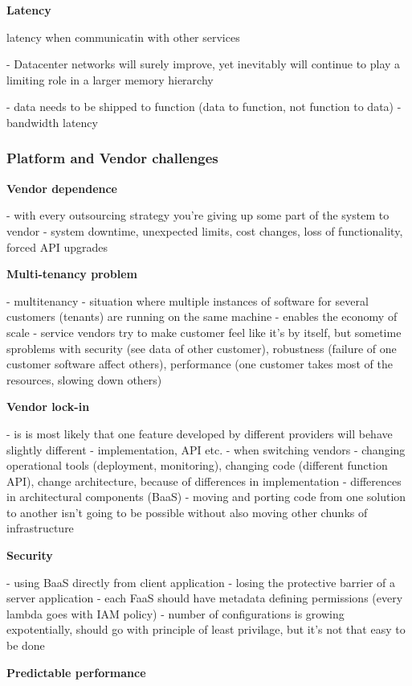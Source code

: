 \textbf{Latency} 

latency when communicatin with other services

- Datacenter networks will surely improve, yet inevitably will continue to play a limiting role in a larger memory hierarchy

- data needs to be shipped to function (data to function, not function to data) - bandwidth latency

\subsubsection*{Platform and Vendor challenges} 

\textbf{Vendor dependence} 

- with every outsourcing strategy you're giving up some part of the system to vendor - system downtime, unexpected limits, cost changes, loss of functionality, forced API upgrades

\textbf{Multi-tenancy problem} 

- multitenancy - situation where multiple instances of software for several customers (tenants) are running on the same machine - enables the economy of scale
- service vendors try to make customer feel like it's by itself, but sometime sproblems with security (see data of other customer), robustness (failure of one customer software affect others), performance (one customer takes most of the resources, slowing down others)

\textbf{Vendor lock-in} 

- is is most likely that one feature developed by different providers will behave slightly different - implementation, API etc.
- when switching vendors - changing operational tools (deployment, monitoring), changing code (different function API), change architecture, because of differences in implementation
- differences in architectural components (BaaS) - moving and porting code from one solution to another isn't going to be possible without also moving other chunks of infrastructure

\textbf{Security} 

- using BaaS directly from client application - losing the protective barrier of a server application
- each FaaS should have metadata defining permissions (every lambda goes with IAM policy) - number of configurations is growing expotentially, should go with principle of least privilage, but it's not that easy to be done

\textbf{Predictable performance} 

